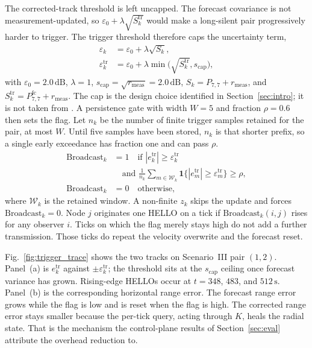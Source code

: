 The corrected-track threshold is left uncapped.
The forecast covariance is not measurement-updated, so
$\varepsilon_0+\lambda\sqrt{S_k^{\mathrm{tr}}}$ would make a
long-silent pair progressively harder to trigger.
The trigger threshold therefore caps the uncertainty term,
\begin{equation}
\label{eq:eps}
\begin{aligned}
\varepsilon_k
&= \varepsilon_0+\lambda\sqrt{S_k},\\
\varepsilon_k^{\mathrm{tr}}
&= \varepsilon_0+\lambda\min\bigl(\sqrt{S_k^{\mathrm{tr}}},
s_{\mathrm{cap}}\bigr),
\end{aligned}
\end{equation}
with $\varepsilon_0=2.0\,\mathrm{dB}$, $\lambda=1$,
$s_{\mathrm{cap}}=\sqrt{r_{\mathrm{meas}}}=2.0\,\mathrm{dB}$,
$S_k=P_{7,7}+r_{\mathrm{meas}}$, and
$S_k^{\mathrm{tr}}=P^{\mathrm{fc}}_{7,7}+r_{\mathrm{meas}}$.
The cap is the design choice identified in
Section~\ref{sec:intro}; it is not taken from
\cite{busacca2024snr}.
A persistence gate with width $W=5$ and fraction $\rho=0.6$ then
sets the flag.
Let $n_k$ be the number of finite trigger samples retained for the
pair, at most $W$.
Until five samples have been stored, $n_k$ is that shorter prefix,
so a single early exceedance has fraction one and can pass
$\rho$.
\begin{equation}
\label{eq:bc}
\begin{aligned}
\mathrm{Broadcast}_k&=1
\quad\text{if }|e_k^{\mathrm{tr}}|\ge\varepsilon_k^{\mathrm{tr}}\\
&\quad\text{and }
\tfrac{1}{n_k}\textstyle\sum_{m\in\mathcal{W}_k}
\mathbf{1}\{|e_m^{\mathrm{tr}}|\ge\varepsilon_m^{\mathrm{tr}}\}\ge\rho,\\
\mathrm{Broadcast}_k&=0
\quad\text{otherwise,}
\end{aligned}
\end{equation}
where $\mathcal{W}_k$ is the retained window.
A non-finite $z_k$ skips the update and forces
$\mathrm{Broadcast}_k=0$.
Node $j$ originates one HELLO on a tick if
$\mathrm{Broadcast}_k(i,j)$ rises for any observer $i$.
Ticks on which the flag merely stays high do not add a further
transmission.
Those ticks do repeat the velocity overwrite and the forecast reset.

Fig.~\ref{fig:trigger_trace} shows the two tracks on
Scenario~III pair $(1,2)$.
Panel~(a) is $e_k^{\mathrm{tr}}$ against
$\pm\varepsilon_k^{\mathrm{tr}}$; the threshold sits at the
$s_{\mathrm{cap}}$ ceiling once forecast variance has grown.
Rising-edge HELLOs occur at $t=348$, $483$, and $512\,\mathrm{s}$.
Panel~(b) is the corresponding horizontal range error.
The forecast range error grows while the flag is low and is reset
when the flag is high.
The corrected range error stays smaller because the per-tick query,
acting through $K$, heals the radial state.
That is the mechanism the control-plane results of
Section~\ref{sec:eval} attribute the overhead reduction to.

